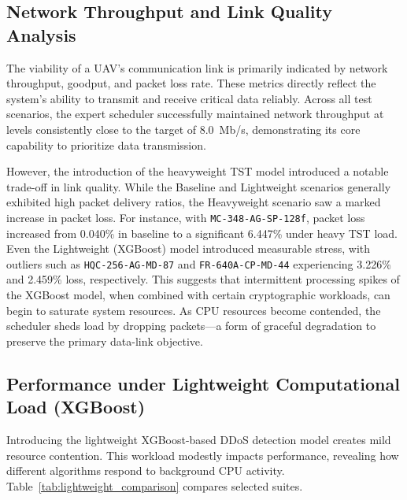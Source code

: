 \documentclass[sigconf,natbib=false]{acmart}
\begin{document}
\subsection{Network Throughput and Link Quality Analysis}

The viability of a UAV's communication link is primarily indicated by network throughput, goodput, and packet loss rate. These metrics directly reflect the system's ability to transmit and receive critical data reliably. Across all test scenarios, the expert scheduler successfully maintained network throughput at levels consistently close to the target of 8.0~Mb/s, demonstrating its core capability to prioritize data transmission.

However, the introduction of the heavyweight TST model introduced a notable trade-off in link quality. While the Baseline and Lightweight scenarios generally exhibited high packet delivery ratios, the Heavyweight scenario saw a marked increase in packet loss. For instance, with \texttt{MC-348-AG-SP-128f}, packet loss increased from 0.040\% in baseline to a significant 6.447\% under heavy TST load. Even the Lightweight (XGBoost) model introduced measurable stress, with outliers such as \texttt{HQC-256-AG-MD-87} and \texttt{FR-640A-CP-MD-44} experiencing 3.226\% and 2.459\% loss, respectively. This suggests that intermittent processing spikes of the XGBoost model, when combined with certain cryptographic workloads, can begin to saturate system resources. As CPU resources become contended, the scheduler sheds load by dropping packets---a form of graceful degradation to preserve the primary data-link objective.

\subsection{Performance under Lightweight Computational Load (XGBoost)}

Introducing the lightweight XGBoost-based DDoS detection model creates mild resource contention. This workload modestly impacts performance, revealing how different algorithms respond to background CPU activity. Table~\ref{tab:lightweight_comparison} compares selected suites.
\end{document}
